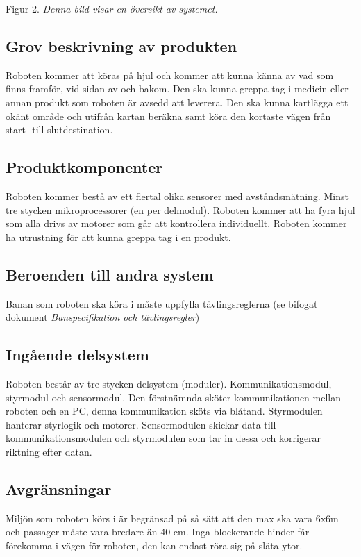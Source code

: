\documentclass[11pt]{article}
\begin{document}
\begin{flushleft}
\begin{center}
Figur 2. \textit{Denna bild visar en översikt av systemet.}
\end{center}

\subsection{Grov beskrivning av produkten}
Roboten kommer att köras på hjul och kommer att kunna känna av vad som finns framför, vid sidan av och bakom. Den ska kunna greppa tag i medicin eller annan produkt som roboten är avsedd att leverera. Den ska kunna kartlägga ett okänt område och utifrån kartan beräkna samt köra den kortaste vägen från start- till slutdestination. 

\subsection{Produktkomponenter}
Roboten kommer bestå av ett flertal olika sensorer med avståndsmätning. Minst tre stycken mikroprocessorer (en per delmodul). Roboten kommer att ha fyra hjul som alla drivs av motorer som går att kontrollera individuellt. Roboten kommer ha utrustning för att kunna greppa tag i en produkt.

\subsection{Beroenden till andra system}
Banan som roboten ska köra i måste uppfylla tävlingsreglerna (se bifogat dokument \textit{Banspecifikation och tävlingsregler})

\subsection{Ingående delsystem}
Roboten består av tre stycken delsystem (moduler). Kommunikationsmodul, styrmodul och sensormodul. Den förstnämnda sköter kommunikationen mellan roboten och en PC, denna kommunikation sköts via blåtand. Styrmodulen hanterar styrlogik och motorer. Sensormodulen skickar data till kommunikationsmodulen och styrmodulen som tar in dessa och korrigerar riktning efter datan.

\subsection{Avgränsningar}
Miljön som roboten körs i är begränsad på så sätt att den max ska vara 6x6m och passager måste vara bredare än 40 cm. Inga blockerande hinder får förekomma i vägen för roboten, den kan endast röra sig på släta ytor.


\end{flushleft}
\end{document}
